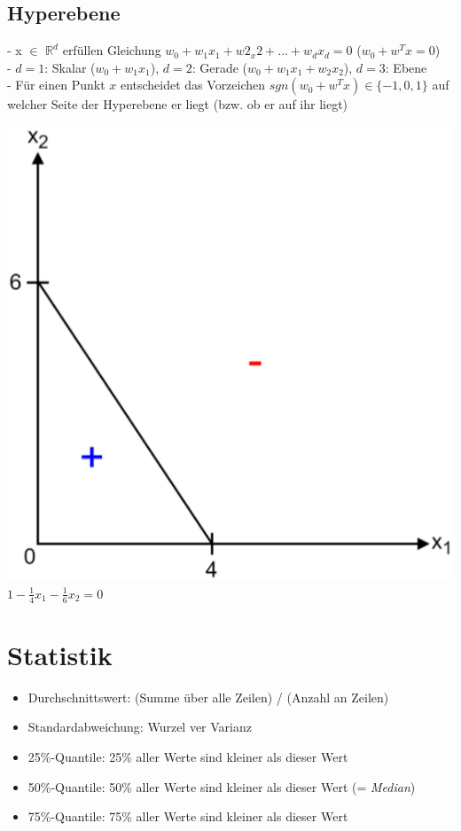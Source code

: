 \documentclass{report}
\begin{document}
\subsection{Hyperebene}
- x $\in$ $\mathbb{R}^d$ erfüllen Gleichung $w_0 + w_1x_1 + w2_x2 + ... + w_dx_d = 0$ ($w_0 + w^Tx = 0$)\\
- $d = 1$: Skalar ($w_0 + w_1x_1$), $d = 2$: Gerade ($w_0 + w_1x_1 + w_2x_2$), $d = 3$: Ebene\\
- Für einen Punkt $x$ entscheidet das Vorzeichen $sgn(w_0 + w^Tx)\in \{-1, 0, 1\}$ auf welcher Seite der Hyperebene er liegt (bzw. ob er auf ihr liegt)\\
\begin{center}
\includegraphics[scale=.2]{ml01_1} $1 - \frac{1}{4}x_1 - \frac{1}{6}x_2 = 0$
\end{center}

\section{Statistik}
\begin{itemize}
  \item Durchschnittswert: (Summe über alle Zeilen) / (Anzahl an Zeilen)
  \item Standardabweichung: Wurzel ver Varianz
  \item 25\%-Quantile: 25\% aller Werte sind kleiner als dieser Wert
  \item 50\%-Quantile: 50\% aller Werte sind kleiner als dieser Wert (= \textit{Median})
  \item 75\%-Quantile: 75\% aller Werte sind kleiner als dieser Wert
\end{itemize}
\end{document}
